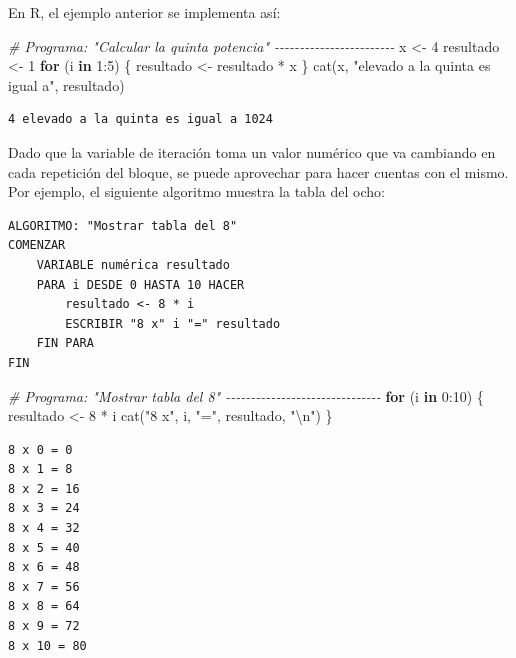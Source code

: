 \documentclass[
]{book}
\newenvironment{Shaded}{\begin{snugshade}}{\end{snugshade}}
\newcommand{\CommentTok}[1]{\textcolor[rgb]{0.56,0.35,0.01}{\textit{#1}}}
\newcommand{\ControlFlowTok}[1]{\textcolor[rgb]{0.13,0.29,0.53}{\textbf{#1}}}
\newcommand{\DecValTok}[1]{\textcolor[rgb]{0.00,0.00,0.81}{#1}}
\newcommand{\FunctionTok}[1]{\textcolor[rgb]{0.00,0.00,0.00}{#1}}
\newcommand{\NormalTok}[1]{#1}
\newcommand{\OtherTok}[1]{\textcolor[rgb]{0.56,0.35,0.01}{#1}}
\newcommand{\SpecialCharTok}[1]{\textcolor[rgb]{0.00,0.00,0.00}{#1}}
\newcommand{\StringTok}[1]{\textcolor[rgb]{0.31,0.60,0.02}{#1}}
\begin{document}
En R, el ejemplo anterior se implementa así:

\begin{Shaded}
\begin{Highlighting}[]
\CommentTok{\# Programa: "Calcular la quinta potencia" {-}{-}{-}{-}{-}{-}{-}{-}{-}{-}{-}{-}{-}{-}{-}{-}{-}{-}{-}{-}{-}{-}{-}{-}}
\NormalTok{x }\OtherTok{\textless{}{-}} \DecValTok{4}
\NormalTok{resultado }\OtherTok{\textless{}{-}} \DecValTok{1}
\ControlFlowTok{for}\NormalTok{ (i }\ControlFlowTok{in} \DecValTok{1}\SpecialCharTok{:}\DecValTok{5}\NormalTok{) \{}
\NormalTok{    resultado }\OtherTok{\textless{}{-}}\NormalTok{ resultado }\SpecialCharTok{*}\NormalTok{ x}
\NormalTok{\}}
\FunctionTok{cat}\NormalTok{(x, }\StringTok{"elevado a la quinta es igual a"}\NormalTok{, resultado)}
\end{Highlighting}
\end{Shaded}

\begin{verbatim}
4 elevado a la quinta es igual a 1024
\end{verbatim}

Dado que la variable de iteración toma un valor numérico que va cambiando en cada repetición del bloque, se puede aprovechar para hacer cuentas con el mismo. Por ejemplo, el siguiente algoritmo muestra la tabla del ocho:

\begin{verbatim}
ALGORITMO: "Mostrar tabla del 8"
COMENZAR
    VARIABLE numérica resultado
    PARA i DESDE 0 HASTA 10 HACER
        resultado <- 8 * i
        ESCRIBIR "8 x" i "=" resultado
    FIN PARA
FIN
\end{verbatim}

\begin{Shaded}
\begin{Highlighting}[]
\CommentTok{\# Programa: "Mostrar tabla del 8" {-}{-}{-}{-}{-}{-}{-}{-}{-}{-}{-}{-}{-}{-}{-}{-}{-}{-}{-}{-}{-}{-}{-}{-}{-}{-}{-}{-}{-}{-}{-}}
\ControlFlowTok{for}\NormalTok{ (i }\ControlFlowTok{in} \DecValTok{0}\SpecialCharTok{:}\DecValTok{10}\NormalTok{) \{}
\NormalTok{    resultado }\OtherTok{\textless{}{-}} \DecValTok{8} \SpecialCharTok{*}\NormalTok{ i}
    \FunctionTok{cat}\NormalTok{(}\StringTok{"8 x"}\NormalTok{, i, }\StringTok{"="}\NormalTok{, resultado, }\StringTok{"}\SpecialCharTok{\textbackslash{}n}\StringTok{"}\NormalTok{)}
\NormalTok{\}}
\end{Highlighting}
\end{Shaded}

\begin{verbatim}
8 x 0 = 0 
8 x 1 = 8 
8 x 2 = 16 
8 x 3 = 24 
8 x 4 = 32 
8 x 5 = 40 
8 x 6 = 48 
8 x 7 = 56 
8 x 8 = 64 
8 x 9 = 72 
8 x 10 = 80 
\end{verbatim}
\end{document}
